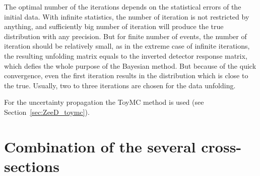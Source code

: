 The optimal number of the iterations depends on the statistical errors of the initial data. With infinite statistics, the number of iteration is not restricted by anything, and sufficiently big number of iteration will produce the true distribution with any precision. But for finite number of events, the number of iteration should be relatively small, as in the extreme case of infinite iterations, the resulting unfolding matrix equals to the inverted detector response matrix, which defies the whole purpose of the Bayesian method. But because of the quick convergence, even the first iteration results in the distribution which is close to the true. Usually, two to three iterations are chosen for the data unfolding.

For the uncertainty propagation the ToyMC method is used (see Section~\ref{sec:ZeeD_toymc}).

\section{Combination of the several cross-sections}
\label{sec:ZeeCS_comb}

